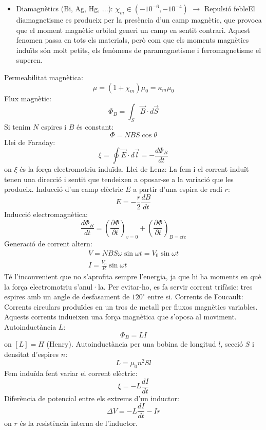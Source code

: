 \documentclass[../../../main.tex]{subfiles}
\begin{document}
\begin{multicols}{2}
\begin{itemize}
        \item Diamagnètics (Bi, Ag, Hg, $\ldots$): $\chi_m\in(-10^{-6},-10^{-4})$ $\rightarrow$ Repulsió feble\newline El diamagnetisme es produeix per la presència d’un camp magnètic, que provoca que el moment magnètic orbital generi un camp en sentit contrari. Aquest fenomen passa en tots els materials, però com que els moments magnètics induïts són molt petits, els fenòmens de paramagnetisme i ferromagnetisme el superen.
    \end{itemize}
    Permeabilitat magnètica: $$\mu=(1+\chi_m)\mu_0=\kappa_m\mu_0$$
    Flux magnètic: $$\Phi_B=\int_S\Vec{B}\cdot d\Vec{S}$$
    Si tenim $N$ espires i $B$ és constant: $$\Phi=NBS\cos\theta$$
    Llei de Faraday: $$\xi=\oint\Vec{E}\cdot d\Vec{l}=-\frac{d\Phi_B}{dt}$$ {on $\xi$ és la força electromotriu induïda.}\newline
    Llei de Lenz: La fem i el corrent induït tenen una direcció i sentit que tendeixen a oposar-se a la variació que les produeix.\newline
    Inducció d'un camp elèctric $E$ a partir d'una espira de radi $r$: $$E=-\frac{r}{2}\frac{dB}{dt}$$
    Inducció electromagnètica: $$\frac{d\Phi_B}{dt}=\left(\frac{\partial\Phi}{\partial t}\right)_{v=0}+\left(\frac{\partial\Phi}{\partial t}\right)_{B=cte}$$
    Generació de corrent altern:
    \begin{gather*}
        V=NBS\omega\sin\omega t=V_0\sin\omega t\\
        I=\frac{V_0}{R}\sin\omega t
    \end{gather*}
    {Té l’inconvenient que no s’aprofita sempre l’energia, ja que hi ha moments en què la força electromotriu s’anul·la. Per evitar-ho, es fa servir corrent trifàsic: tres espires amb un angle de desfasament de $120^\circ$ entre si.}\newline
    Corrents de Foucault: Corrents circulars produïdes en un tros de metall per fluxos magnètics variables. Aquests corrents indueixen una força magnètica que s’oposa al moviment.\newline
    Autoinductància $L$:
    $$\Phi_B=LI$$ {on $[L]=H$ (Henry).}\newline
    Autoinductància per una bobina de longitud $l$, secció $S$ i densitat d'espires $n$: $$L=\mu_0n^2Sl$$
    Fem induïda fent variar el corrent elèctric: $$\xi=-L\frac{dI}{dt}$$
    Diferència de potencial entre els extrems d'un inductor: $$\Delta V=-L\frac{dI}{dt}-Ir$$ {on $r$ és la resistència interna de l'inductor.}\newline

\end{multicols}
\end{document}
